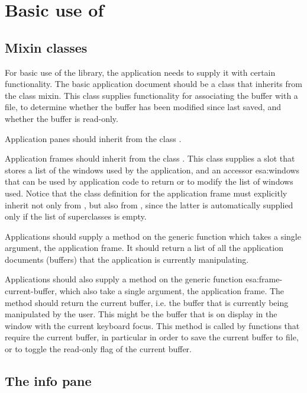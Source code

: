 \chapter{Basic use of \sysname{}}

\section{Mixin classes}

For basic use of the \sysname{} library, the application needs to supply it
with certain functionality.  The basic application document should be a
class that inherits from the class  mixin.
This class supplies functionality for associating the buffer with a
file, to determine whether the buffer has been modified since last
saved, and whether the buffer is read-only.

Application panes should inherit from the class
.

Application frames should inherit from the class
.  This class supplies a slot that stores a
list of the windows used by the application, and an accessor esa:windows
that can be used by application code to return or to modify the list of
windows used.  Notice that the class definition for the application
frame must explicitly inherit not only from , but
also from , since the latter is
automatically supplied only if the list of superclasses is empty.

Applications should supply a method on the generic function
 which takes a single argument, the application frame.
It should return a list of all the application documents (buffers) that
the application is currently manipulating.

Applications should also supply a method on the generic function
esa:frame-current-buffer, which also take a single argument, the
application frame.  The method should return the current buffer,
i.e. the buffer that is currently being manipulated by the user.  This
might be the buffer that is on display in the window with the current
keyboard focus.  This method is called by functions that require the
current buffer, in particular in order to save the current buffer to
file, or to toggle the read-only flag of the current buffer.  

\section{The info pane}

